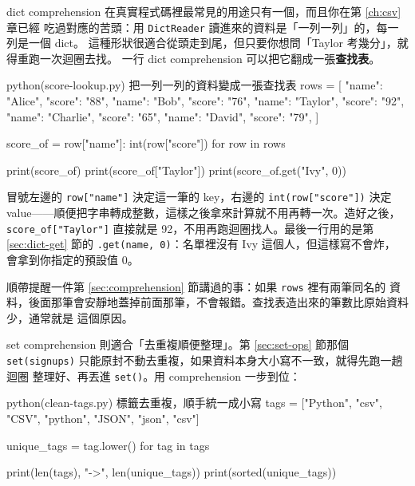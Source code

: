 dict comprehension 在真實程式碼裡最常見的用途只有一個，而且你在第 \ref{ch:csv} 章已經
吃過對應的苦頭：用 \texttt{DictReader} 讀進來的資料是「一列一列」的，每一列是一個 dict。
這種形狀很適合從頭走到尾，但只要你想問「Taylor 考幾分」，就得重跑一次迴圈去找。
一行 dict comprehension 可以把它翻成一張\textbf{查找表}。

\begin{example}{python}{(score-lookup.py) 把一列一列的資料變成一張查找表}
rows = [
    {"name": "Alice", "score": "88"},
    {"name": "Bob", "score": "76"},
    {"name": "Taylor", "score": "92"},
    {"name": "Charlie", "score": "65"},
    {"name": "David", "score": "79"},
]

score_of = {row["name"]: int(row["score"]) for row in rows}

print(score_of)
print(score_of["Taylor"])
print(score_of.get("Ivy", 0))
\end{example}


冒號左邊的 \texttt{row["name"]} 決定這一筆的 key，右邊的 \texttt{int(row["score"])} 決定
value——順便把字串轉成整數，這樣之後拿來計算就不用再轉一次。造好之後，
\texttt{score\_of["Taylor"]} 直接就是 92，不用再跑迴圈找人。最後一行用的是第
\ref{sec:dict-get} 節的 \texttt{.get(name, 0)}：名單裡沒有 Ivy 這個人，但這樣寫不會炸，
會拿到你指定的預設值 0。

順帶提醒一件第 \ref{sec:comprehension} 節講過的事：如果 \texttt{rows} 裡有兩筆同名的
資料，後面那筆會安靜地蓋掉前面那筆，不會報錯。查找表造出來的筆數比原始資料少，通常就是
這個原因。

set comprehension 則適合「去重複順便整理」。第 \ref{sec:set-ops} 節那個
\texttt{set(signups)} 只能原封不動去重複，如果資料本身大小寫不一致，就得先跑一趟迴圈
整理好、再丟進 \texttt{set()}。用 comprehension 一步到位：

\begin{example}{python}{(clean-tags.py) 標籤去重複，順手統一成小寫}
tags = ["Python", "csv", "CSV", "python", "JSON", "json", "csv"]

unique_tags = {tag.lower() for tag in tags}

print(len(tags), "->", len(unique_tags))
print(sorted(unique_tags))
\end{example}


